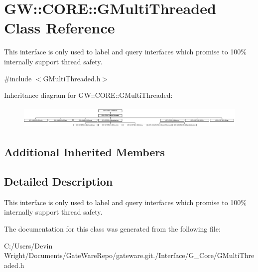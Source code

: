 \hypertarget{class_g_w_1_1_c_o_r_e_1_1_g_multi_threaded}{}\section{GW\+:\+:C\+O\+RE\+:\+:G\+Multi\+Threaded Class Reference}
\label{class_g_w_1_1_c_o_r_e_1_1_g_multi_threaded}


This interface is only used to label and query interfaces which promise to 100\% internally support thread safety.  




{\ttfamily \#include $<$G\+Multi\+Threaded.\+h$>$}

Inheritance diagram for GW\+:\+:C\+O\+RE\+:\+:G\+Multi\+Threaded\+:\begin{figure}[H]
\begin{center}
\leavevmode
\includegraphics[height=1.101278cm]{class_g_w_1_1_c_o_r_e_1_1_g_multi_threaded}
\end{center}
\end{figure}
\subsection*{Additional Inherited Members}


\subsection{Detailed Description}
This interface is only used to label and query interfaces which promise to 100\% internally support thread safety. 

The documentation for this class was generated from the following file\+:\begin{DoxyCompactItemize}
\item 
C\+:/\+Users/\+Devin Wright/\+Documents/\+Gate\+Ware\+Repo/gateware.\+git./\+Interface/\+G\+\_\+\+Core/G\+Multi\+Threaded.\+h\end{DoxyCompactItemize}
